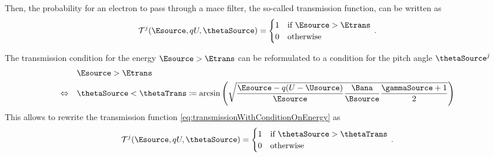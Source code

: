 Then, the probability for an electron to pass through a \gls{mace} filter, the so-called transmission function, can be written as
\begin{equation}
    \label{eq:transmissionWithConditionOnEnergy}
    \mathcal{T}^j(\Esource, qU, \thetaSource) =
    \begin{cases}
    1 & \text{if } \Esource > \Etrans \\
    0 & \text{otherwise} 
    \end{cases}
    \fullstop
\end{equation}

The transmission condition for the energy $\Esource > \Etrans$ can be reformulated to a condition for the pitch angle $\thetaSource^j$
\begin{align}
    \label{eq:transmissionPitchAngle}
    &\Esource > \Etrans \\
    \Leftrightarrow \quad
    & \thetaSource < \thetaTrans
    \coloneqq
    \arcsin
    \left(\sqrt{
        \frac{\Esource-q(U-\Usource)}{\Esource} 
        \frac{\Bana}{\Bsource}
        \frac{\gammaSource+1}{2}
    }\right)
\end{align}
This allows to rewrite the transmission function \eqref{eq:transmissionWithConditionOnEnergy} as
\begin{equation}
    \label{eq:transmission}
    \mathcal{T}^j(\Esource, qU, \thetaSource) =
    \begin{cases}
    1 & \text{if } \thetaSource > \thetaTrans \\
    0 & \text{otherwise} 
    \end{cases}
    \fullstop
\end{equation}

